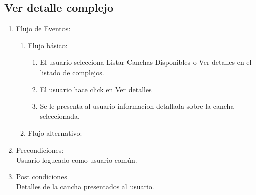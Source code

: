 \documentclass[a4paper,11pt]{article}
\begin{document}
\subsection{Ver detalle complejo}
\begin{enumerate}


    \begin{enumerate}
    \item Descripción breve: \\
        Se muestra en detalle las características de una cancha.
    \item Actores \\
        Administrador.
    \item Disparadores: \\
        Click en el botón \emph{Ver detalles} dentro de la
        página que lista las canchas o en la vista dellada de un complejo.
    \end{enumerate}

    \item Flujo de Eventos: 

    \begin{enumerate}

        \item Flujo básico:
        \begin{enumerate}
            \item El usuario selecciona \underline{Listar Canchas Disponibles}
                o \underline{Ver detalles} en el listado de complejos.
            \item El usuario hace click en \underline{Ver detalles}
            \item Se le presenta al usuario informacion detallada sobre la cancha seleccionada.
        \end{enumerate}
    \item Flujo alternativo:\\
    \end{enumerate}

    \item Precondiciones: \\
        Usuario logueado como usuario común.

    \item Post condiciones \\
        Detalles de la cancha presentados al usuario.

\end{enumerate}
\end{document}

